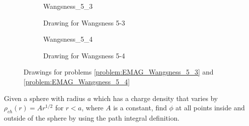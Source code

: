 \documentclass[crop=false,class=article,oneside]{standalone}
\begin{document}
    \begin{figure}[H]
        \centering
        \captionsetup{type=figure}
        \begin{subfigure}[b]{0.49\textwidth}
            \centering
            {Wangsness_5_3}
            \caption{Drawing for Wangsness 5-3}
            \label{fig:EMAG_Wangsness_5_3}
        \end{subfigure}
        \begin{subfigure}[b]{0.49\textwidth}
            \centering
            {Wangsness_5_4}
            \caption{Drawing for Wangsness 5-4}
            \label{fig:EMAG_Wangsness_5_4}
        \end{subfigure}
        \caption{%
            Drawings for problems
            \ref{problem:EMAG_Wangsness_5_3}
            and
            \ref{problem:EMAG_Wangsness_5_4}
        }
    \end{figure}
    \begin{problem}[Wangsness 5-10]
        Given a sphere with radius $a$ which has
        a charge density that varies by
        $\rho_{ch}(r)=Ar^{1/2}$ for $r<a$, where $A$
        is a constant, find $\phi$ at all points inside
        and outside of the sphere by using the path
        integral definition.
    \end{problem}
\end{document}
